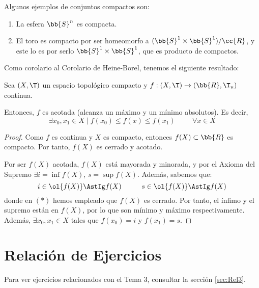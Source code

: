 \begin{ejemplo}
    Algunos ejemplos de conjuntos compactos son:
    \begin{enumerate}
        \item La esfera $\bb{S}^{n}$ es compacta.
        \item El toro es compacto por ser homeomorfo a $(\bb{S}^1\times \bb{S}^1)/\cc{R}$, y este lo es por serlo $\bb{S}^1\times \bb{S}^1$, que es producto de compactos.
    \end{enumerate}
\end{ejemplo}

Como corolario al Corolario de Heine-Borel, tenemos el siguiente resultado:
\begin{coro}
    Sea $(X,\T)$ un espacio topológico compacto y $f:(X,\T)\to (\bb{R},\T_u)$ continua.
    
    Entonces, $f$ es acotada (alcanza un máximo y un mínimo absolutos). Es decir,
    \begin{equation*}
        \exists x_0,x_1\in X \mid f(x_0) \leq f(x) \leq f(x_1) \hspace{1cm} \forall x\in X
    \end{equation*}
\end{coro}
\begin{proof}
    Como $f$ es continua y $X$ es compacto, entonces $f(X)\subset \bb{R}$ es compacto. Por tanto, $f(X)$ es cerrado y acotado.

    Por ser $f(X)$ acotada, $f(X)$ está mayorada y minorada, y por el Axioma del Supremo $\exists i=\inf f(X)$, $s=\sup f(X)$. Además, sabemos que:
    \begin{equation*}
        i\in \ol{f(X)}\AstIg f(X) \hspace{1cm}
        s\in \ol{f(X)}\AstIg f(X)
    \end{equation*}
    donde en $(\ast)$ hemos empleado que $f(X)$ es cerrado. Por tanto, el ínfimo y el supremo están en $f(X)$, por lo que son mínimo y máximo respectivamente.
    Además, $\exists x_0,x_1\in X$ tales que $f(x_0)=i$ y $f(x_1)=s$.

\end{proof}


\section{Relación de Ejercicios}
Para ver ejercicios relacionados con el Tema 3, consultar la sección \ref{sec:Rel3}.